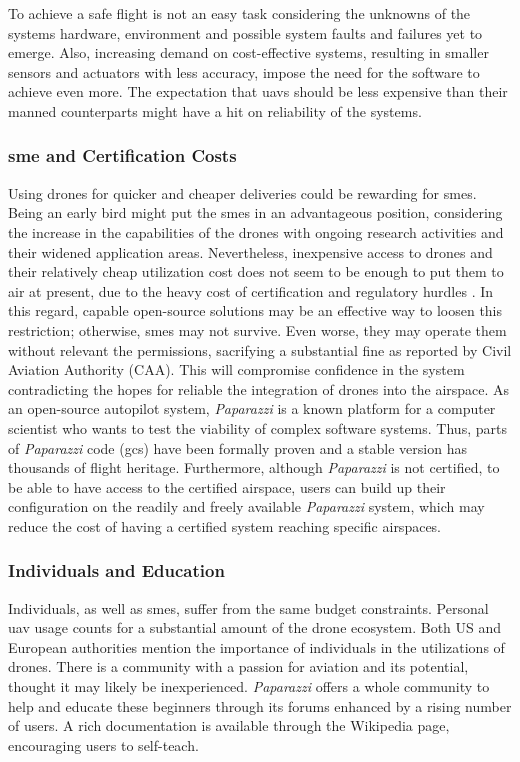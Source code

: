 To achieve a safe flight is not an easy task considering the unknowns of the systems hardware, environment and possible system faults and failures yet to emerge. Also, increasing demand on cost-effective systems, resulting in smaller sensors and actuators with less accuracy, impose the need for the software to achieve even more. The expectation that \gls{uav}s should be less expensive than their manned counterparts might have a hit on reliability of the systems. 

\subsubsection{\gls{sme} and Certification Costs}

Using drones for quicker and cheaper deliveries could be rewarding for \gls{sme}s. Being an early bird might put the \gls{sme}s in an advantageous position, considering the increase in the capabilities of the drones with ongoing research activities and their widened application areas. 
Nevertheless, inexpensive access to drones and their relatively cheap utilization cost does not seem to be enough to put them to air at present, due to the heavy cost of certification and regulatory hurdles \cite{UAVreliabilityStudy}. 
In this regard, capable open-source solutions may be an effective way to loosen this restriction;  otherwise, \gls{sme}s may not survive. Even worse, they may operate them without relevant the permissions, sacrifying a substantial fine as reported by Civil Aviation Authority (CAA). This will compromise confidence in the system contradicting the hopes for reliable the integration of drones into the airspace. As an open-source autopilot system, \emph{Paparazzi} is a known platform for a computer scientist who wants to test the viability of complex software systems. Thus, parts of \emph{Paparazzi} code (\gls{gcs}) have been formally proven \cite{pprz_formal_proof} and a stable version has thousands of flight heritage. Furthermore, although \emph{Paparazzi} is not certified, to be able to have access to the certified airspace, users can build up their configuration on the readily and freely available \emph{Paparazzi} system, which may reduce the cost of having a certified system reaching specific airspaces.

\subsubsection{Individuals and Education}

Individuals, as well as \gls{sme}s, suffer from the same budget constraints. Personal \gls{uav} usage counts for a substantial amount of the drone ecosystem.  Both US and European authorities mention the importance of individuals in the utilizations of drones. There is a community with a passion for aviation and its potential, thought it may likely be inexperienced. \emph{Paparazzi} offers a whole community to help and educate these beginners through its forums enhanced by a rising number of users.  A rich documentation is available through the Wikipedia page, encouraging users to self-teach.  

